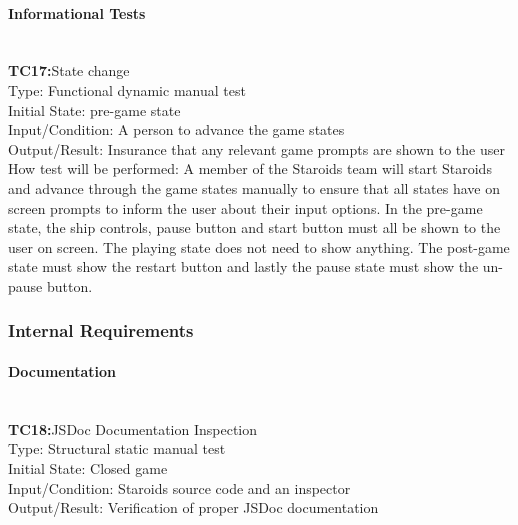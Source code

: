 \documentclass[12pt, titlepage]{article}
\begin{document}
\paragraph{Informational Tests\\\\}


\textbf{TC17:}State change\\

Type: Functional dynamic manual test\\

Initial State: pre-game state\\

Input/Condition: A person to advance the game states\\

Output/Result: Insurance that any relevant game prompts are shown to the user\\

How test will be performed: A member of the Staroids team will start Staroids and advance through the game states manually to ensure that all states have on screen prompts to inform the user about their input options. In the pre-game state, the ship controls, pause button and start button must all be shown to the user on screen. The playing state does not need to show anything. The post-game state must show the restart button and lastly the pause state must show the un-pause button.\\


\subsubsection{Internal Requirements}

\paragraph{Documentation\\\\}

\textbf{TC18:}JSDoc Documentation Inspection\\

Type: Structural static manual test\\

Initial State: Closed game\\

Input/Condition: Staroids source code and an inspector\\

Output/Result: Verification of proper JSDoc documentation\\
\end{document}
